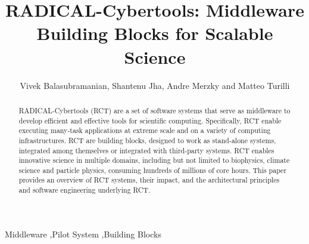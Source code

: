 \documentclass[preprint,12pt, a4paper]{elsarticle}
\begin{document}
\begin{frontmatter}

\title{RADICAL-Cybertools: Middleware Building Blocks for Scalable Science}

\author{Vivek Balasubramanian, Shantenu Jha, Andre Merzky and Matteo Turilli}
\address{Electrical \& Computer Engineering, Rutgers University, Piscataway,NJ 08854, USA}

\begin{abstract}

RADICAL-Cybertools (RCT) are a set of software systems that serve as middleware to develop efficient and effective tools for scientific computing. Specifically, RCT enable executing many-task applications at extreme scale and on a variety of computing infrastructures. RCT are building blocks, designed to work as stand-alone systems, integrated among themselves or integrated with third-party systems. RCT enables innovative science in multiple domains, including but not limited to biophysics, climate science and particle physics, consuming hundreds of millions of core hours. This paper provides an overview of RCT systems, their impact, and the architectural principles and software engineering underlying RCT\@. 
\end{abstract}

\begin{keyword}

Middleware \sep Pilot System \sep Building Blocks



\end{keyword}

\end{frontmatter}


\end{document}
